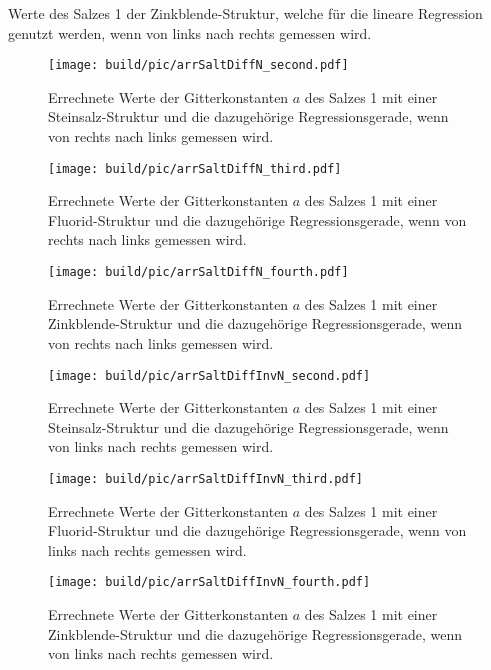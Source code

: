 \begin{table}[!htbp]
    \centering
    \caption{Werte des Salzes 1 der Zinkblende-Struktur, welche für die lineare Regression genutzt werden, wenn von links nach rechts gemessen wird.}
    
    \label{tab:data_salt_fit_inv_4}
\end{table}
\begin{figure}
    \centering
    \texttt{[image: build/pic/arrSaltDiffN\_second.pdf]}
    \caption{Errechnete Werte der Gitterkonstanten $a$ des Salzes 1 mit einer Steinsalz-Struktur und die dazugehörige Regressionsgerade, wenn von rechts nach links gemessen wird.}
    \label{fig:data_salt_fit_2}
\end{figure}
\clearpage
\begin{figure}
    \centering
    \texttt{[image: build/pic/arrSaltDiffN\_third.pdf]}
    \caption{Errechnete Werte der Gitterkonstanten $a$ des Salzes 1 mit einer Fluorid-Struktur und die dazugehörige Regressionsgerade, wenn von rechts nach links gemessen wird.}
    \label{fig:data_salt_fit_3}
\end{figure}
\begin{figure}
    \centering
    \texttt{[image: build/pic/arrSaltDiffN\_fourth.pdf]}
    \caption{Errechnete Werte der Gitterkonstanten $a$ des Salzes 1 mit einer Zinkblende-Struktur und die dazugehörige Regressionsgerade, wenn von rechts nach links gemessen wird.}
    \label{fig:data_salt_fit_4}
\end{figure}
\begin{figure}
    \centering
    \texttt{[image: build/pic/arrSaltDiffInvN\_second.pdf]}
    \caption{Errechnete Werte der Gitterkonstanten $a$ des Salzes 1 mit einer Steinsalz-Struktur und die dazugehörige Regressionsgerade, wenn von links nach rechts gemessen wird.}
    \label{fig:data_salt_fit_inv_2}
\end{figure}
\begin{figure}
    \centering
    \texttt{[image: build/pic/arrSaltDiffInvN\_third.pdf]}
    \caption{Errechnete Werte der Gitterkonstanten $a$ des Salzes 1 mit einer Fluorid-Struktur und die dazugehörige Regressionsgerade, wenn von links nach rechts gemessen wird.}
    \label{fig:data_salt_fit_inv_3}
\end{figure}
\begin{figure}
    \centering
    \texttt{[image: build/pic/arrSaltDiffInvN\_fourth.pdf]}
    \caption{Errechnete Werte der Gitterkonstanten $a$ des Salzes 1 mit einer Zinkblende-Struktur und die dazugehörige Regressionsgerade, wenn von links nach rechts gemessen wird.}
    \label{fig:data_salt_fit_inv_4}
\end{figure}

